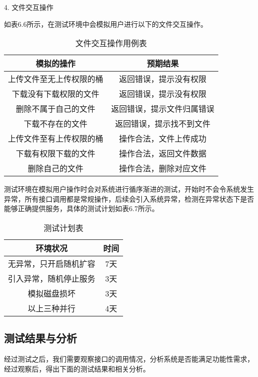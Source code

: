 4. 文件交互操作

如表6.6所示，在测试环境中会模拟用户进行以下的文件交互操作。
\newline

\begin{table}[h]
  \centering
  \caption{文件交互操作用例表}
  \begin{tabular}{cc}
    \toprule
    模拟的操作   & 预期结果   \\
    \midrule
    上传文件至无上传权限的桶   & 返回错误，提示没有权限  \\
    下载没有下载权限的文件     & 返回错误，提示没有权限  \\
    删除不属于自己的文件       & 返回错误，提示文件归属错误  \\
    下载不存在的文件          & 返回错误，提示找不到文件  \\
    上传文件至有上传权限的桶   & 操作合法，文件上传成功  \\
    下载有权限下载的文件       & 操作合法，返回文件数据  \\
    删除自己的文件            & 操作合法，删除对应文件  \\
    \bottomrule
  \end{tabular}
\end{table}

测试环境在模拟用户操作时会对系统进行循序渐进的测试，开始时不会令系统发生异常，所有接口调用都是常规操作，后续会引入系统异常，检测在异常状态下是否能够正确提供服务，具体的测试计划如表6.7所示。

\begin{table}[h]
    \centering
    \caption{测试计划表}
    \begin{tabular}{cc}
      \toprule
      环境状况   & 时间   \\
      \midrule
      无异常，只开启随机扩容  & 7天  \\
      引入异常，随机停止服务  & 3天     \\
      模拟磁盘损坏           & 3天  \\
      以上三种并行           & 4天     \\
      \bottomrule
    \end{tabular}
\end{table}

\subsection{测试结果与分析}%

经过测试之后，我们需要观察接口的调用情况，分析系统是否能满足功能性需求，经过观察后，得出下面的测试结果和相关分析。

